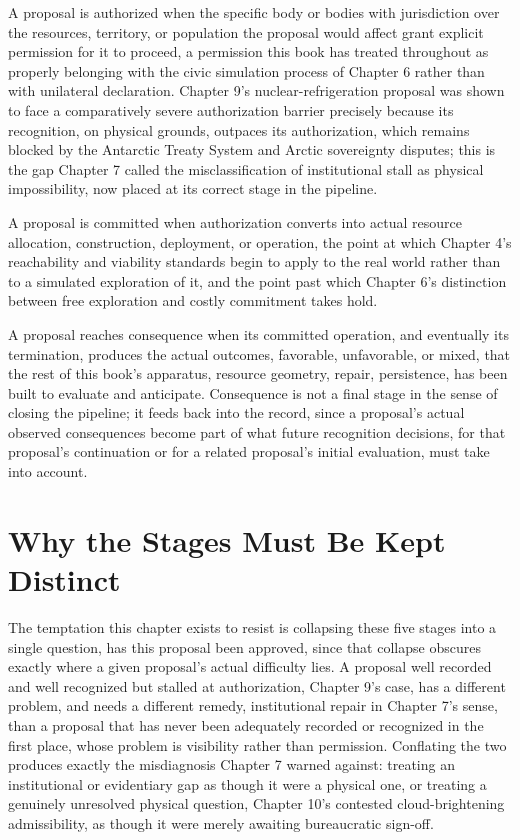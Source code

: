 \documentclass[11pt,oneside]{book}
\begin{document}
A proposal is authorized when the specific body or bodies with jurisdiction over the resources, territory, or population the proposal would affect grant explicit permission for it to proceed, a permission this book has treated throughout as properly belonging with the civic simulation process of Chapter 6 rather than with unilateral declaration. Chapter 9's nuclear-refrigeration proposal was shown to face a comparatively severe authorization barrier precisely because its recognition, on physical grounds, outpaces its authorization, which remains blocked by the Antarctic Treaty System and Arctic sovereignty disputes; this is the gap Chapter 7 called the misclassification of institutional stall as physical impossibility, now placed at its correct stage in the pipeline.

A proposal is committed when authorization converts into actual resource allocation, construction, deployment, or operation, the point at which Chapter 4's reachability and viability standards begin to apply to the real world rather than to a simulated exploration of it, and the point past which Chapter 6's distinction between free exploration and costly commitment takes hold.

A proposal reaches consequence when its committed operation, and eventually its termination, produces the actual outcomes, favorable, unfavorable, or mixed, that the rest of this book's apparatus, resource geometry, repair, persistence, has been built to evaluate and anticipate. Consequence is not a final stage in the sense of closing the pipeline; it feeds back into the record, since a proposal's actual observed consequences become part of what future recognition decisions, for that proposal's continuation or for a related proposal's initial evaluation, must take into account.

\section*{Why the Stages Must Be Kept Distinct}

The temptation this chapter exists to resist is collapsing these five stages into a single question, has this proposal been approved, since that collapse obscures exactly where a given proposal's actual difficulty lies. A proposal well recorded and well recognized but stalled at authorization, Chapter 9's case, has a different problem, and needs a different remedy, institutional repair in Chapter 7's sense, than a proposal that has never been adequately recorded or recognized in the first place, whose problem is visibility rather than permission. Conflating the two produces exactly the misdiagnosis Chapter 7 warned against: treating an institutional or evidentiary gap as though it were a physical one, or treating a genuinely unresolved physical question, Chapter 10's contested cloud-brightening admissibility, as though it were merely awaiting bureaucratic sign-off.
\end{document}
